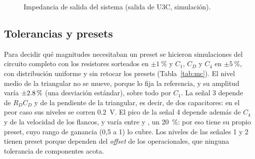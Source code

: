 \begin{figure}[!htb]
\centering
{}
\caption{Impedancia de salida del sistema (salida de U3C, simulación).}
\label{fig:zout}
\end{figure}

\subsection{Tolerancias y presets}
\label{sec:tolerancias}
Para decidir qué magnitudes necesitaban un preset se hicieron  simulaciones del circuito completo con los resistores sorteados en $\pm\SI{1}{\percent}$ y $C_1$, $C_D$ y $C_4$ en $\pm\SI{5}{\percent}$, con distribución uniforme y sin retocar los presets (Tabla~\ref{tab:mc}). El nivel medio de la triangular no se mueve, porque lo fija la referencia, y su amplitud varía $\pm\valu{1}{100*\simMcVppDesv/\simMcVppMedia}{\percent}$ (una desviación estándar), sobre todo por $C_1$. La señal 3 depende de $R_D C_D$ y de la pendiente de la triangular, es decir, de dos capacitores: en el peor caso sus niveles se corren \SI{0,2}{\volt}. El pico de la señal 4 depende además de $C_4$ y de la velocidad de los flancos, y varía entre  y , un \SI{20}{\percent}: por eso tiene su propio preset, cuyo rango de ganancia (0,5 a 1) lo cubre. Los niveles de las señales 1 y 2 tienen preset porque dependen del \emph{offset} de los operacionales, que ninguna tolerancia de componentes acota.

